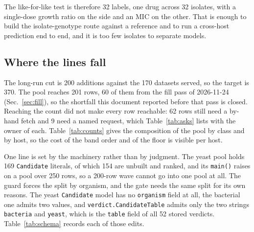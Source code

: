 The like-for-like test is therefore 32 labels, one drug across 32 isolates, with a
single-dose growth ratio on the  side and an MIC on the other. That is
enough to build the isolate-genotype route against a  reference and to
run a cross-host prediction end to end, and it is too few isolates to separate models.

\subsection{Where the lines fall}\label{sec:lines}

The long-run cut is 200 additions against the 170 datasets served, so the target is 370. The
pool reaches 201 rows, 60 of them from the fill pass of 2026-11-24 (Sec.~\ref{sec:fill}), so
the shortfall this document reported before that pass is closed. Reaching the count did not
make every row reachable: 62 rows still need a by-hand fetch and 9 need a named request, which
Table~\ref{tab:asks} lists with the owner of each. Table~\ref{tab:counts} gives the composition of the pool by class and by host, so the
cost of the band order and of the floor is visible per host.



One line is set by the machinery rather than by judgment. The yeast pool holds 169
\texttt{Candidate} literals, of which 154 are unbuilt and ranked, and its \texttt{main()}
raises on a pool over 250 rows, so a 200-row wave cannot go into one pool at all. The guard
forces the split by organism, and the gate needs the same split for its own reasons. The yeast
\texttt{Candidate} model has no \texttt{organism} field at all, the bacterial one admits two
values, and \texttt{verdict.CandidateTable} admits only the two strings
\texttt{bacteria} and \texttt{yeast}, which is the \texttt{table} field of all 52 stored
verdicts. Table~\ref{tab:schema} records each of those edits.
